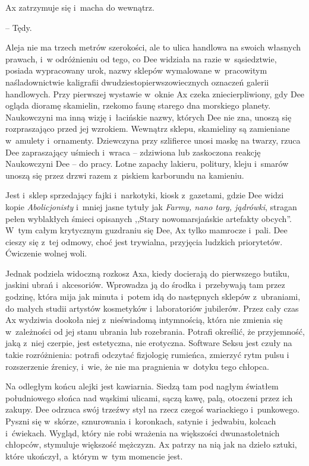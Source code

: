 \documentclass[oneside,polish,11pt,sfheadings]{mwbk}
\begin{document}
Ax zatrzymuje się i~macha do wewnątrz. 

-- Tędy.

Aleja nie ma trzech metrów szerokości, ale to ulica handlowa na swoich
własnych prawach, i~w odróżnieniu od tego, co Dee widziała na razie w~sąsiedztwie, posiada wypracowany urok, nazwy sklepów wymalowane w~pracowitym naśladownictwie kaligrafii dwudziestopierwszowiecznych
oznaczeń galerii handlowych. Przy pierwszej wystawie w~oknie Ax czeka
zniecierpliwiony, gdy Dee ogląda dioramę skamielin, rzekomo faunę
starego dna morskiego planety. Naukowczyni ma inną wizję i~łacińskie
nazwy, których Dee nie zna, unoszą się rozpraszająco przed jej wzrokiem.
Wewnątrz sklepu, skamieliny są zamieniane w~amulety i~ornamenty.
Dziewczyna przy szlifierce unosi maskę na twarzy, rzuca Dee zapraszający
uśmiech i~wraca -- zdziwiona lub zaskoczona reakcję Naukowczyni Dee -- do
pracy. Lotne zapachy lakieru, politury, kleju i~smarów unoszą się przez
drzwi razem z~piskiem karborundu na kamieniu.

Jest i~sklep sprzedający fajki i~narkotyki, kiosk z~gazetami, gdzie Dee
widzi kopie \emph{Abolicjonisty} i~mniej jasne tytuły jak \emph{Farmy,
nano targ, jądrówki}, stragan pełen wyblakłych śmieci opisanych ,,Stary
nowomarsjańskie artefakty obcych''. W~tym całym krytycznym guzdraniu się
Dee, Ax tylko mamrocze i~pali. Dee cieszy się z~tej odmowy, choć jest
trywialna, przyjęcia ludzkich priorytetów. Ćwiczenie wolnej woli.

Jednak podziela widoczną rozkosz Axa, kiedy docierają do pierwszego
butiku, jaskini ubrań i~akcesoriów. Wprowadza ją do środka i~przebywają
tam przez godzinę, która mija jak minuta i~potem idą do następnych
sklepów z~ubraniami, do małych studii artystów kosmetyków i~laboratoriów
jubilerów. Przez cały czas Ax wydziwia dookoła niej z~nieświadomą
intymnością, która nie zmienia się w~zależności od jej stanu ubrania lub
rozebrania. Potrafi określić, że przyjemność, jaką z~niej czerpie, jest
estetyczna, nie erotyczna. Software Seksu jest czuły na takie
rozróżnienia: potrafi odczytać fizjologię rumieńca, zmierzyć rytm pulsu
i rozszerzenie źrenicy, i~wie, że nie ma pragnienia w~dotyku tego
chłopca.

Na odległym końcu alejki jest kawiarnia. Siedzą tam pod nagłym światłem
południowego słońca nad wąskimi ulicami, sączą kawę, palą, otoczeni
przez ich zakupy. Dee odrzuca swój trzeźwy styl na rzecz czegoś
wariackiego i~punkowego. Pyszni się w~skórze, sznurowania i~koronkach,
satynie i~jedwabiu, kolcach i~ćwiekach. Wygląd, który nie robi wrażenia
na większości dwunastoletnich chłopców, stymuluje większość mężczyzn. Ax
patrzy na nią jak na dzieło sztuki, które ukończył, a~którym w~tym
momencie jest.
\end{document}
